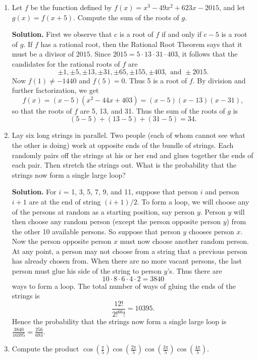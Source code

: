 \documentclass[9pt]{article}
\newcommand{\D}{\displaystyle}
\begin{document}
\begin{enumerate}
   \item Let $f$ be the function defined by $f(x) = x^3 - 49x^2 + 623x - 2015$,
         and let $g(x) = f(x + 5)$. Compute the sum of the roots of $g$.

      \textbf{Solution.} First we observe that $c$ is a root of $f$ if and only
      if $c-5$ is a root of $g$. If $f$ has a rational root, then the Rational
      Root Theorem says that it must be a divisor of $2015$. Since
      $2015 = 5 \cdot 13 \cdot 31 \cdot 403$, it follows that the candidates for 
      the rational roots of $f$ are
      $$\pm1, \pm5, \pm13, \pm31, \pm65, \pm155, \pm403, \text{ and } \pm2015.$$
      Now $f(1) \neq -1440$ and $f(5) = 0$. Thus 5 is a root of $f$. By
      division and further factorization, we get
      $$f(x) = (x - 5)(x^2 -44x + 403) = (x - 5)(x - 13)(x - 31),$$
      so that the roots of $f$ are 5, 13, and 31. Thus the sum of the roots of
      $g$ is
      $$(5 - 5) + (13 - 5) + (31 - 5) = 34.$$
   \item Lay six long strings in parallel. Two people (each of whom cannot see
         what the other is doing) work at opposite ends of the bundle of
         strings. Each randomly pairs off the strings at his or her end and
         glues together the ends of each pair. Then stretch the strings out.
         What is the probability that the strings now form a single large loop?

      \textbf{Solution.} For $i$ = 1, 3, 5, 7, 9, and 11, suppose that person
      $i$ and person $i+1$ are at the end of string $(i + 1) / 2$. To form a
      loop, we will choose any of the persons at random as a starting position,
      say person $y$. Person $y$ will then choose any random person (except the
      person opposite person $y$) from the other 10 available persons. So
      suppose that person $y$ chooses person $x$. Now the person opposite person
      $x$ must now choose another random person. At any point, a person may not
      choose from a string that a previous person has already chosen from. When
      there are no more vacant persons, the last person must glue his side of
      the string to person $y$'s. Thus 
      there are
      $$10 \cdot 8 \cdot 6 \cdot 4 \cdot 2 = 3840$$
      ways to form a loop. The total number of ways of gluing the ends of the
      strings is
      $$\frac{12!}{2!^66!} = 10395.$$
      Hence the probability that the strings now form a single large loop is
      $\D\frac{3840}{10395} = \frac{256}{693}$.
   \item Compute the product $\D\cos\left(\frac{\pi}{5}\right)\cos\left(
         \frac{2\pi}{5}\right)\cos\left(\frac{3\pi}{5}\right)\cos\left(
         \frac{4\pi}{5}\right)$.


\end{enumerate}
\end{document}
